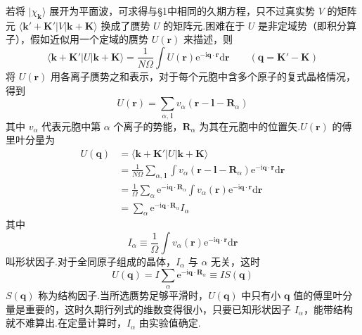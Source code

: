 若将 $|\chi_{\boldsymbol{k}}\rangle$ 展开为平面波，可求得与§1中相同的久期方程，只不过真实势 $V$ 的矩阵元 $\langle\boldsymbol{k}'+\boldsymbol{K}'|V|\boldsymbol{k}+\boldsymbol{K}\rangle$ 换成了赝势 $U$ 的矩阵元.困难在于 $U$ 是非定域势（即积分算子），假如近似用一个定域的赝势 $U(\boldsymbol{r})$ 来描述，则
\begin{equation}
  \langle\boldsymbol{k}+\boldsymbol{K}'|U|\boldsymbol{k}+\boldsymbol{K}\rangle
  =\frac{1}{N\Omega}\int U(\boldsymbol{r})\mathrm{e}^{-\mathrm{i}\boldsymbol{q}\cdot\boldsymbol{r}}\mathrm{d}\boldsymbol{r}
  \qquad(\boldsymbol{q}=\boldsymbol{K}'-\boldsymbol{K})
\end{equation}
将 $U(\boldsymbol{r})$ 用各离子赝势之和表示，对于每个元胞中含多个原子的复式晶格情况，得到
\begin{equation}
  U(\boldsymbol{r})=\sum_{\alpha,\,\boldsymbol{l}}v_{\alpha}(\boldsymbol{r}-\boldsymbol{l}-\boldsymbol{R}_{\alpha})
\end{equation}
其中 $v_{\alpha}$ 代表元胞中第 $\alpha$ 个离子的势能，$\boldsymbol{R}_{\alpha}$ 为其在元胞中的位置矢.$U(\boldsymbol{r})$ 的傅里叶分量为
\begin{equation}
\begin{aligned}
  U(\boldsymbol{q})&=\langle\boldsymbol{k}+\boldsymbol{K}'|U|\boldsymbol{k}+\boldsymbol{K}\rangle\\
  &=\frac{1}{N\Omega}\sum_{\alpha,\,\boldsymbol{l}}\int v_{\alpha}(\boldsymbol{r}-\boldsymbol{l}-\boldsymbol{R}_{\alpha})\mathrm{e}^{-\mathrm{i}\boldsymbol{q}\cdot\boldsymbol{r}}\mathrm{d}\boldsymbol{r}\\
  &=\frac{1}{\Omega}\sum_{\alpha}\mathrm{e}^{-\mathrm{i}\boldsymbol{q}\cdot\boldsymbol{R}_{\alpha}}\int v_{\alpha}(\boldsymbol{r})\mathrm{e}^{-\mathrm{i}\boldsymbol{q}\cdot\boldsymbol{r}}\mathrm{d}\boldsymbol{r}\\
  &=\sum_{\alpha}\mathrm{e}^{-\mathrm{i}\boldsymbol{q}\cdot\boldsymbol{R}_{\alpha}}I_{\alpha}
\end{aligned}
\end{equation}
其中
\begin{equation}
  I_{\alpha}\equiv\frac{1}{\Omega}\int v_{\alpha}(\boldsymbol{r})\mathrm{e}^{-\mathrm{i}\boldsymbol{q}\cdot\boldsymbol{r}}\mathrm{d}\boldsymbol{r}
\end{equation}
叫形状因子.对于全同原子组成的晶体，$I_{\alpha}$ 与 $\alpha$ 无关，这时
\begin{equation}
  U(\boldsymbol{q})=I\sum_{\alpha}\mathrm{e}^{-\mathrm{i}\boldsymbol{q}\cdot\boldsymbol{R}_{\alpha}}\equiv IS(\boldsymbol{q})
\end{equation}
$S(\boldsymbol{q})$ 称为结构因子.当所选赝势足够平滑时，$U(\boldsymbol{q})$ 中只有小 $\boldsymbol{q}$ 值的傅里叶分量是重要的，这时久期行列式的维数变得很小，只要已知形状因子 $I_{\alpha}$，能带结构就不难算出.在定量计算时，$I_{\alpha}$ 由实验值确定.

